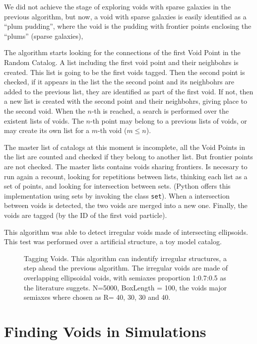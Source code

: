 \documentclass[preprint]{aastex62}
\begin{document}
We did not achieve the stage of exploring voids with sparse galaxies in the
previous algorithm, but now, a void with sparse galaxies is easily identified
as a ``plum pudding'', where the void is the pudding with frontier points
enclosing the ``plums'' (sparse galaxies), 

The algorithm starts looking for the connections of the first Void Point in the
Random Catalog. A list including the first void point and their neighbohrs is
created. This list is going to be the first voids tagged. Then the second point
is checked, if it appears in the list the the second point and its neighbohrs
are added to the previous list, they are identified as part of the first void.
If not, then a new list is created with the second point and their neighbohrs,
giving place to the second void. When the $n$-th  is reached, a search is
performed over the existent lists of voids. The $n$-th point may belong to
a previous lists of voids, or may create its own list for a $m$-th void
($ m \leq n$). 

The master list of catalogs at this moment is incomplete, all the Void Points
in the list are counted and checked if they belong to another list. But frontier
points are not checked. The master lists contains voids sharing frontiers.
Is necesary to run again a recount, looking for repetitions between lists,
thinking each list as a set of points,
and looking for intersection between sets. (Python offers this implementation
using sets by invoking the class \texttt{set}). When a intersection between voids
is detected, the two voids are merged into a new one. Finally, the voids are
tagged (by the ID of the first void particle).


This algorithm was able to detect irregular voids made of intersecting
ellipsoids. This test was performed over a artificial structure, a toy model catalog.


\begin{figure}
  \caption{Tagging Voids. This algorithm can indentify irregular structures,
    a step ahead the previous algorithm. The irregular voids are made of
    overlapping ellipsoidal voids, with semiaxes proportion 1:0.7:0.5 as the 
    literature suggets.  
    N=5000, BoxLength = 100, the voids major semiaxes where chosen as
    R= 40, 30, 30 and 40.
    \label{fig:Tagging Toy Model Voids}}
\end{figure}


\section{Finding Voids in Simulations}
\end{document}
